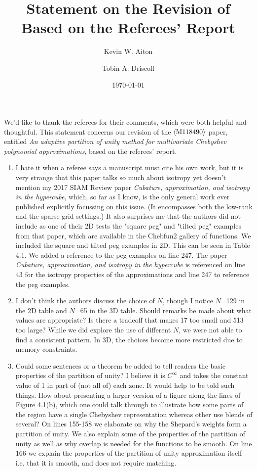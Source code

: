 \documentclass[10pt]{article}
\title{Statement on the Revision of \meta{M118490} \\
  Based on the Referees' Report}
\author{Kevin W. Aiton \and Tobin A. Driscoll}
\date{\today}
\newcommand\meta[1]{$\langle\hbox{#1}\rangle$}
\begin{document}
We'd like to thank the referees for their comments, which were both helpful and thoughtful. This statement concerns our revision of the \meta{M118490} paper,
entitled \textit{An adaptive partition of unity method for multivariate Chebyshev polynomial approximations}, based on the referees' report.

\begin{enumerate}
\item \begin{response}{  I hate it when a referee says a manuscript must cite his own work, but it is very strange that this paper
talks so much about isotropy yet doesn't mention my 2017
SIAM Review paper \textit{Cubature, approximation, and isotropy
in the hypercube}, which, so far as I know, is the only
general work ever published explicitly focussing on this
issue. (It encompasses both the low-rank and the sparse
grid settings.) It also surprises me that the authors did
not include as one of their 2D tests the "square peg" and
"tilted peg" examples from that paper, which are available
in the Chebfun2 gallery of functions. }
We included the square and tilted peg examples in 2D. This can be seen in Table 4.1. We added a reference to the peg examples on line 247. The paper \textit{Cubature, approximation, and isotropy in the hypercube} is referenced on line 43 for the isotropy properties of the approximations and line 247 to reference the peg examples.
\end{response}

\item \begin{response}{ I don't think the authors discuss the choice of $N$, though I notice $N$=129 in the 2D table and $N$=65 in the
3D table. Should remarks be made about what values are
appropriate? Is there a tradeoff that makes 17 too small
and 513 too large? }
While we did explore the use of different $N$, we were not able to find a consistent pattern. In 3D, the choices become more restricted due to memory constraints.
\end{response}

\item \begin{response}{ Could some sentences or a theorem be added to tell readers the basic properties of the partition of unity?
I believe it is $C^{\infty}$ and takes the constant value of
1 in part of (not all of) each zone. It would help to be
told such things. How about presenting a larger version
of a figure along the lines of Figure 4.1(b), which one
could talk through to illustrate how some parts of the
region have a single Chebyshev representation whereas
other use blends of several?}
On lines 155-158 we elaborate on why the Shepard's weights form a partition of unity. We also explain some of the properties of the partition of unity as well as why overlap is needed for the functions to be smooth. On line 166 we explain the properties of the partition of unity approximation itself i.e. that it is smooth, and does not require matching.


\end{response}
\end{enumerate}
\end{document}
